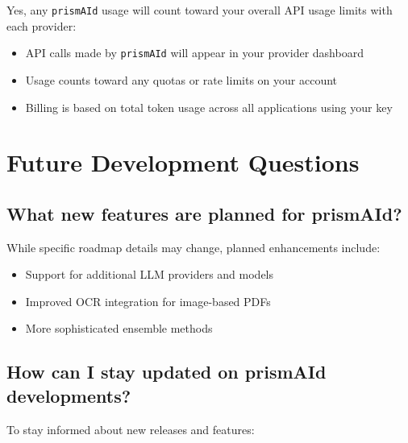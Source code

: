 Yes, any \texttt{prismAId} usage will count toward your overall API usage limits with each provider:

\begin{itemize}
    \item API calls made by \texttt{prismAId} will appear in your provider dashboard
    \item Usage counts toward any quotas or rate limits on your account
    \item Billing is based on total token usage across all applications using your key
\end{itemize}

\section{Future Development Questions}

\subsection{What new features are planned for prismAId?}

While specific roadmap details may change, planned enhancements include:

\begin{itemize}
    \item Support for additional LLM providers and models
    \item Improved OCR integration for image-based PDFs
    \item More sophisticated ensemble methods
\end{itemize}


\subsection{How can I stay updated on prismAId developments?}

To stay informed about new releases and features:

